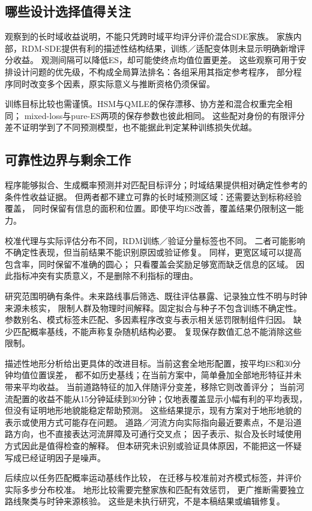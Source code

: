 \subsection{哪些设计选择值得关注}
观察到的长时域收益说明，不能只凭跨时域平均评分评价混合SDE家族。
家族内部，RDM-SDE提供有利的描述性结构结果，训练／适配变体则未显示明确新增评分收益。
观测间隔可以降低ES，却可能使终点均值位置更差。
这些观察可用于安排设计问题的优先级，不构成全局算法排名：各组采用其指定参考程序，
部分程序同时改变多个因素，原实际意义与推断资格仍须保留。

训练目标比较也需谨慎。HSM与QMLE的保存漂移、协方差和混合权重完全相同；
mixed-loss与pure-ES两项的保存参数也彼此相同。
这些配对身份的有限评分差不证明学到了不同预测模型，也不能据此判定某种训练损失优越。

\subsection{可靠性边界与剩余工作}
程序能够拟合、生成概率预测并对匹配目标评分；时域结果提供相对确定性参考的条件性收益证据。
但两者都不建立可靠的长时域预测区域：还需要达到标称经验覆盖，
同时保留有信息的面积和位置。即使平均ES改善，覆盖结果仍限制这一能力。

校准代理与实际评估分布不同，RDM训练／验证分量标签也不同。
二者可能影响不确定性表现，但当前结果不能识别原因或验证修复。
同样，更宽区域可以提高包含率，同时保留不准确的圆心；
只看覆盖会奖励足够宽而缺乏信息的区域。
因此指标冲突有实质意义，不是删除不利指标的理由。

研究范围明确有条件。未来路线事后筛选、既往评估暴露、记录独立性不明与时钟来源未核实，
限制人群及物理时间解释。固定拟合与种子不包含训练不确定性。
参数别名、模式标签未匹配、多因素程序改变与表示相关惩罚限制组件归因。
缺少匹配概率基线，不能声称复杂随机结构必要。
复现保存数值汇总不能消除这些限制。

描述性地形分析给出更具体的改进目标。当前这套全地形配置，按平均ES和30分钟均值位置误差，
都不如历史基线；在当前方案中，简单叠加全部地形特征并未带来平均收益。
当前道路特征的加入伴随评分变差，移除它则改善评分；
当前河流配置的收益不能从15分钟延续到30分钟；仅地表覆盖显示小幅有利的平均表现，
但没有证明地形地貌能稳定帮助预测。
这些结果提示，现有方案对于地形地貌的表示或使用方式可能存在问题。
道路／河流方向实际指向最近要素点，不是沿道路方向，也不直接表达河流屏障及可通行交叉点；
因子表示、拟合及长时域使用方式因此是值得检查的解释。
但本研究未识别或验证具体原因，不能把这一怀疑写成已经证明因子是噪声。

后续应以任务匹配概率运动基线作比较，
在迁移与校准前对齐模式标签，并评价实际多步分布校准。
地形比较需要完整家族和匹配有效惩罚，
更广推断需要独立路线聚类与时钟来源核验。
这些是未执行研究，不是本稿结果或编辑修复。

